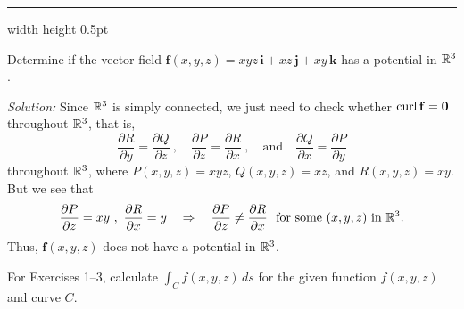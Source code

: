 \medskip
\hrule width \textwidth height 0.5pt
\begin{exmp}
Determine if the vector field $\mathbf{f}(x,y,z) = xyz\,\mathbf{i} + xz\,\mathbf{j} + xy\,\mathbf{k}$ has a
 potential in $\mathbb{R}^{3}$.\smallskip
\par\noindent\emph{Solution:} 
Since $\mathbb{R}^{3}$ is simply connected, we just need to check whether $\mathop{\mathrm{curl}}\nolimits\mathbf{f} = \mathbf{0}$ throughout $\mathbb{R}^{3}$, that is,
 \begin{displaymath}
  \frac{\partial R}{\partial y} = \frac{\partial Q}{\partial z}~,\quad
  \frac{\partial P}{\partial z} = \frac{\partial R}{\partial x}~,\quad\text{and}\quad
  \frac{\partial Q}{\partial x} = \frac{\partial P}{\partial y}
 \end{displaymath}
 throughout $\mathbb{R}^{3}$, where $P(x,y,z)=xyz$, $Q(x,y,z)=xz$, and $R(x,y,z)=xy$. But we see that
 \begin{displaymath}
  \frac{\partial P}{\partial z} = xy ~,~ \frac{\partial R}{\partial x} = y \quad\Rightarrow\quad
  \frac{\partial P}{\partial z} \ne \frac{\partial R}{\partial x} ~~\text{for some $(x,y,z)$ in $\mathbb{R}^{3}$.}
 \end{displaymath}
 Thus, $\mathbf{f}(x,y,z)$ does not have a potential in $\mathbb{R}^{3}$.
\end{exmp}
\startexercises\label{sec4dot5}
\par\noindent For Exercises 1--3, calculate $\int_C f(x,y,z)\,ds$ for the given function $f(x,y,z)$ and
curve $C$.
